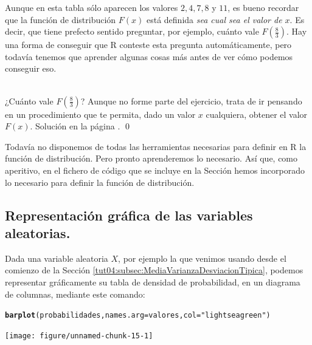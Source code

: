 \documentclass[10pt,a4paper]{article}\usepackage[]{graphicx}\usepackage[]{color}
\makeatletter
\newcommand{\hlstr}[1]{\textcolor[rgb]{0.192,0.494,0.8}{#1}}%
\newcommand{\hlstd}[1]{\textcolor[rgb]{0.345,0.345,0.345}{#1}}%
\newcommand{\hlkwc}[1]{\textcolor[rgb]{0.333,0.667,0.333}{#1}}%
\newcommand{\hlkwd}[1]{\textcolor[rgb]{0.737,0.353,0.396}{\textbf{#1}}}%
\newenvironment{kframe}{%
 \def\at@end@of@kframe{}%
 \ifinner\ifhmode%
  \def\at@end@of@kframe{\end{minipage}}%
  \begin{minipage}{\columnwidth}%
 \fi\fi%
 \def\FrameCommand##1{\hskip\@totalleftmargin \hskip-\fboxsep
 \colorbox{shadecolor}{##1}\hskip-\fboxsep
     \hskip-\linewidth \hskip-\@totalleftmargin \hskip\columnwidth}%
 \MakeFramed {\advance\hsize-\width
   \@totalleftmargin\z@ \linewidth\hsize
   \@setminipage}}%
 {\par\unskip\endMakeFramed%
 \at@end@of@kframe}
\newenvironment{knitrout}{}{} %
\newcounter {cont01}
\makeatother
\begin{document}
Aunque en esta tabla sólo aparecen los valores $2, 4, 7, 8$ y $11$, es bueno recordar que la función de distribución $F(x)$ está definida {\em sea cual sea el valor de $x$}. Es decir, que tiene prefecto sentido preguntar, por ejemplo, cuánto vale $F(\frac{8}{3})$. Hay una forma de conseguir que R conteste esta pregunta automáticamente, pero todavía tenemos que aprender algunas cosas más antes de ver cómo podemos conseguir eso.

\begin{ejercicio}
\label{tut04:ejercicio03}
\quad\\
¿Cuánto vale $F(\frac{8}{3})$? Aunque no forme parte del ejercicio, trata de ir pensando en un procedimiento que te permita, dado un valor $x$ cualquiera, obtener el valor $F(x)$.
Solución en la página \pageref{tut04:ejercicio03:sol}.
\qed
\end{ejercicio}

Todavía no disponemos de todas las herramientas necesarias para definir en R la función de distribución. Pero pronto aprenderemos lo necesario. Así que, como aperitivo, en el fichero de código que se incluye en la Sección hemos incorporado lo necesario para definir la función de distribución.


\subsection{Representación gráfica de las variables aleatorias.}
\label{tut04:subsec:RepresentacionGraficaDistribuciones}

Dada una variable aleatoria $X$, por ejemplo la que venimos usando desde el comienzo de la Sección \ref{tut04:subsec:MediaVarianzaDesviacionTipica}, podemos representar gráficamente su tabla de densidad de probabilidad, en un diagrama de columnas, mediante este comando:
\begin{knitrout}
\color{fgcolor}\begin{kframe}
\begin{alltt}
\hlkwd{barplot}\hlstd{(probabilidades,} \hlkwc{names.arg}\hlstd{=valores,} \hlkwc{col}\hlstd{=}\hlstr{"lightseagreen"}\hlstd{)}
\end{alltt}
\end{kframe}
\texttt{[image: figure/unnamed-chunk-15-1]} 

\end{knitrout}
%
\end{document}
